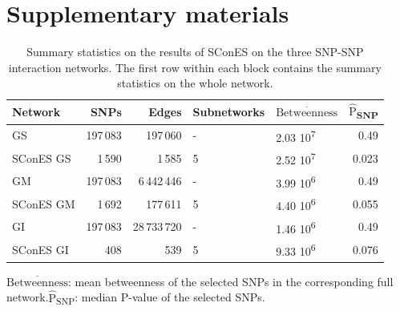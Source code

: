 \documentclass[twocolumn, 11pt]{article}
\newcommand{\mean}[1]{$\overline{\mbox{#1}}$}
\newcommand{\median}[1]{$\hat{\mbox{#1}}$}
\begin{document}



\clearpage
\setcounter{figure}{0}
\setcounter{section}{0}
\setcounter{table}{0}

\section{Supplementary materials}

\begin{table}[htbp]
\begin{threeparttable}
\caption{\label{tab:snp_solutions}
Summary statistics on the results of SConES on the three SNP-SNP interaction networks. The first row within each block contains the summary statistics on the whole network.}
\centering
\begin{tabular}{lrrllr}
Network & SNPs & Edges & Subnetworks & \mean{Betweenness} & \median{P}\textsubscript{SNP}\\
\hline
GS & 197\,083 & 197\,060 & - & 2.03 \texttimes{} 10\textsuperscript{7} & 0.49\\
SConES GS & 1\,590 & 1\,585 & 5 & 2.52 \texttimes{} 10\textsuperscript{7} & 0.023\\
\hline
GM & 197\,083 & 6\,442\,446 & - & 3.99 \texttimes{} 10\textsuperscript{6} & 0.49\\
SConES GM & 1\,692 & 177\,611 & 5 & 4.40 \texttimes{} 10\textsuperscript{6} & 0.055\\
\hline
GI & 197\,083 & 28\,733\,720 & - & 1.46 \texttimes{} 10\textsuperscript{6} & 0.49\\
SConES GI & 408 & 539 & 5 & 9.33 \texttimes{} 10\textsuperscript{6} & 0.076\\
\end{tabular}
\begin{tablenotes}
  \footnotesize{
    \item \mean{Betweenness}: mean betweenness of the selected SNPs in the corresponding full network.\median{P}\textsubscript{SNP}: median P-value of the selected SNPs.
  }
\end{tablenotes}
\end{threeparttable}
\end{table}
\end{document}
